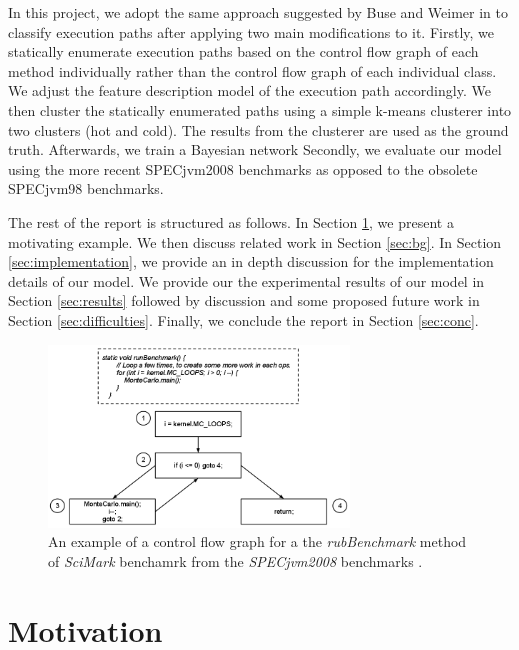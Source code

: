 \documentclass[10pt,twocolumn,letterpaper]{article}
\begin{document}
In this project, we adopt the same approach suggested by Buse and Weimer in \cite{buse2009road} to classify execution paths after applying two main
modifications to it. Firstly, we statically enumerate execution paths based on the control flow graph of each method individually rather than the control flow
graph of each individual class. We adjust the feature description model of the execution path accordingly. We then cluster the statically enumerated paths using
a simple k-means clusterer into two clusters (hot and cold). The results from the clusterer are used as the ground truth. Afterwards, we train a
Bayesian network Secondly, we evaluate our model using the more recent SPECjvm2008 \cite{specjvm2008} benchmarks as opposed to the obsolete SPECjvm98
\cite{specjvm98} benchmarks.

The rest of the report is structured as follows. In Section \ref{sec:motivation}, we present a motivating example. We then discuss related work in Section
\ref{sec:bg}. In Section \ref{sec:implementation}, we provide an in depth discussion for the implementation details of our model. We provide our the
experimental results of our model in Section \ref{sec:results} followed by discussion and some proposed future work in Section \ref{sec:difficulties}. Finally,
we conclude the report in Section \ref{sec:conc}.

\begin{figure}[t]
\centering
\includegraphics[width=8cm]{imgs/cfg.png}
\caption{An example of a control flow graph for a the \textit{rubBenchmark} method of \textit{SciMark} benchamrk from the \textit{SPECjvm2008} benchmarks
\cite{specjvm2008}.}
\label{fig:cfg}
\end{figure}


\section{Motivation}
\label{sec:motivation}
\end{document}
